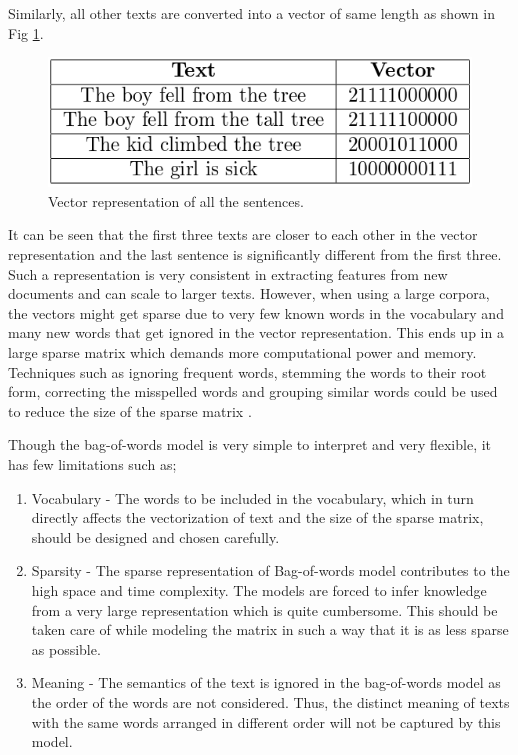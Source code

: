 	Similarly, all other texts are converted into a vector of same length as shown in Fig \ref{bowex2}.
	
	\begin{figure}[h!]
		\centering
		\includegraphics[scale=0.5]{images/bowex2}
		\caption{Vector representation of all the sentences.}
		\label{bowex2}
	\end{figure}
	
	It can be seen that the first three texts are closer to each other in the vector representation and the last sentence is significantly different from the first three. Such a representation is very consistent in extracting features from new documents and can scale to larger texts. However, when using a large corpora, the vectors might get sparse due to very few known words in the vocabulary and many new words that get ignored in the vector representation. This ends up in a large sparse matrix which demands more computational power and memory. Techniques such as ignoring frequent words, stemming the words to their root form, correcting the misspelled words and grouping similar words could be used to reduce the size of the sparse matrix \cite{bow_model}.
	
	Though the bag-of-words model is very simple to interpret and very flexible, it has few limitations such as;
	
	\begin{enumerate}
		\item Vocabulary - The words to be included in the vocabulary, which in turn directly affects the vectorization of text and the size of the sparse matrix, should be designed and chosen carefully.
		\item Sparsity - The sparse representation of Bag-of-words model contributes to the high space and time complexity. The models are forced to infer knowledge from a very large representation which is quite cumbersome. This should be taken care of while modeling the matrix in such a way that it is as less sparse as possible.
		\item Meaning - The semantics of the text is ignored in the bag-of-words model as the order of the words are not considered. Thus, the distinct meaning of texts with the same words arranged in different order will not be captured by this model. 
		
	\end{enumerate}     
	
